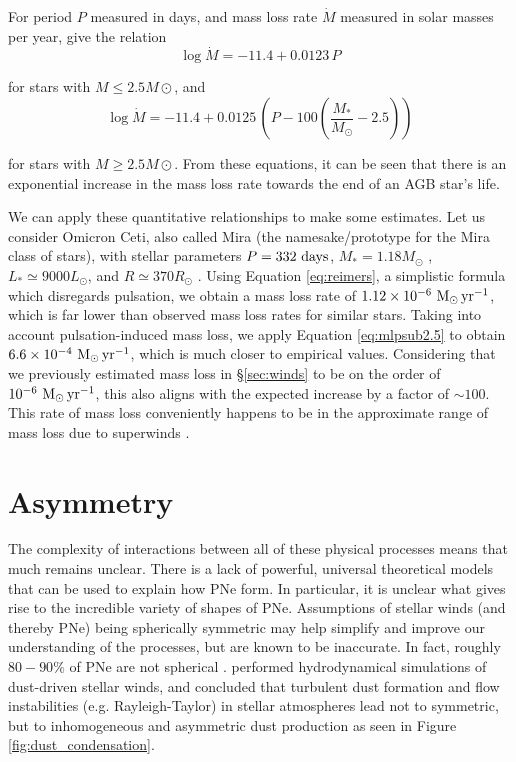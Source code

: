 \documentclass[twocolumn]{aastex63}
\begin{document}
For period $P$ measured in days, and mass loss rate $\dot M$ measured in solar masses per year, \cite{vassiliadis} give the relation 
\begin{equation}\label{eq:mlpsub2.5}
    \log \dot M = -11.4 + 0.0123\,P
\end{equation}

for stars with $M\leq 2.5M\odot$, and
\begin{equation}\label{eq:mlpover2.5}
    \log \dot M = -11.4 + 0.0125\,\left(P - 100\left(\frac{M_*}{M_\odot} - 2.5\right)\right) 
\end{equation}

for stars with $M\geq 2.5M\odot$. From these equations, it can be seen that there is an exponential increase in the mass loss rate towards the end of an AGB star's life. 

We can apply these quantitative relationships to make some estimates. Let us consider Omicron Ceti, also called Mira (the namesake/prototype for the Mira class of stars), with stellar parameters $P = 332~{\rm days}$, $M_* = 1.18M_\odot$ \citep{wyatt}, $L_* \simeq 9000 L_\odot$, and $R \simeq 370 R_\odot$ \citep{woodruff}. Using Equation \ref{eq:reimers}, a simplistic formula which disregards pulsation, we obtain a mass loss rate of $1.12\times 10^{-6}~{\rm M_\odot\,yr^{-1}}$, which is far lower than observed mass loss rates for similar stars. Taking into account pulsation-induced mass loss, we apply Equation \ref{eq:mlpsub2.5} to obtain $6.6\times 10^{-4}~{\rm M_\odot\,yr^{-1}}$, which is much closer to empirical values. Considering that we previously estimated mass loss in \S \ref{sec:winds} to be on the order of $10^{-6}~{\rm M_\odot\,yr^{-1}}$, this also aligns with the expected increase by a factor of $\sim 100$. This rate of mass loss conveniently happens to be in the approximate range of mass loss due to superwinds \citep{iben}. 


\section{Asymmetry}\label{sec:asymmetry}

The complexity of interactions between all of these physical processes means that much remains unclear. There is a lack of powerful, universal theoretical models that can be used to explain how PNe form. In particular, it is unclear what gives rise to the incredible variety of shapes of PNe. Assumptions of stellar winds (and thereby PNe) being spherically symmetric may help simplify and improve our understanding of the processes, but are known to be inaccurate. In fact, roughly $80-90\%$ of PNe are not spherical \citep{demarco, soker1997}. \cite{woitke} performed hydrodynamical simulations of dust-driven stellar winds, and concluded that turbulent dust formation and flow instabilities (e.g. Rayleigh-Taylor) in stellar atmospheres lead not to symmetric, but to inhomogeneous and asymmetric dust production as seen in Figure \ref{fig:dust_condensation}.
\end{document}

